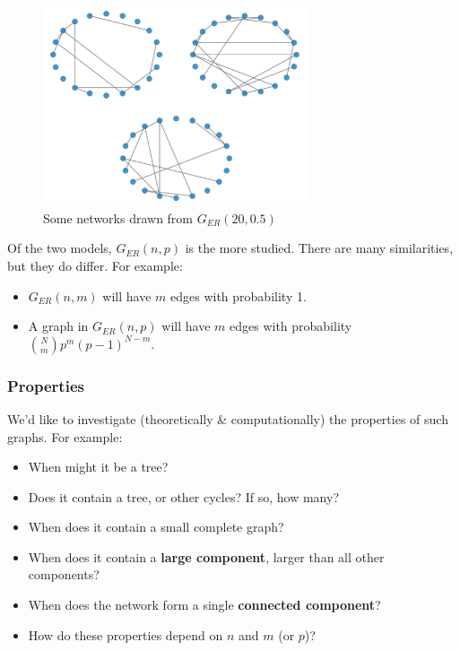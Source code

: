 \documentclass[a4paper,11pt]{article}
\begin{document}
\begin{figure}[H]
    \centering
    \includegraphics[width=0.7\textwidth]{./images/gnm2005.png}
    \caption{ Some networks drawn from $G_{ER}(20,0.5)$ }
\end{figure}

Of the two models, $G_{ER}(n,p)$ is the more studied.
There are many similarities, but they do differ.
For example:
\begin{itemize}
    \item   $G_{ER}(n,m)$ will have $m$ edges with probability 1.
    \item   A graph in $G_{ER}(n,p)$ will have $m$ edges with probability $\binom{N}{m}p^m(p-1)^{N-m}$.
\end{itemize}

\subsubsection{Properties}
We'd like to investigate (theoretically \& computationally) the properties of such graphs.
For example:
\begin{itemize}
    \item   When might it be a tree?
    \item   Does it contain a tree, or other cycles? If so, how many?
    \item   When does it contain a small complete graph?
    \item   When does it contain a \textbf{large component}, larger than all other components?
    \item   When does the network form a single \textbf{connected component}?
    \item   How do these properties depend on $n$ and $m$ (or $p$)?
\end{itemize}
\end{document}
